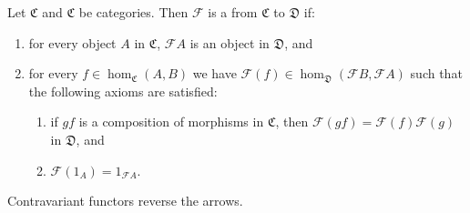 \begin{definition}
Let $\mathfrak{C}$ and $\mathfrak{C}$ be categories. Then $\mathcal{F}$ is a  from $\mathfrak{C}$ to $\mathfrak{D}$ if:
\begin{enumerate}[label=(\roman*)]
\setlength{\itemsep}{0pt}
\item for every object $A$ in $\mathfrak{C}$, $\mathcal{F}A$ is an object in $\mathfrak{D}$, and
\item for every $f \in \hom_{\mathfrak{C}} (A,B)$ we have $\mathcal{F}(f) \in \hom_{\mathfrak{D}}(\mathcal{F}B, \mathcal{F}A)$ such that the following axioms are satisfied:
\begin{enumerate}[label=\arabic*.]
\setlength{\itemsep}{0pt}
\item if $gf$ is a composition of morphisms in $\mathfrak{C}$, then $\mathcal{F}(gf) = \mathcal{F}(f) \mathcal{F}(g)$ in $\mathfrak{D}$, and
\item $\mathcal{F}(1_A) = 1_{\mathcal{F}A}$.
\end{enumerate}
\end{enumerate}
Contravariant functors reverse the arrows.
\end{definition}

